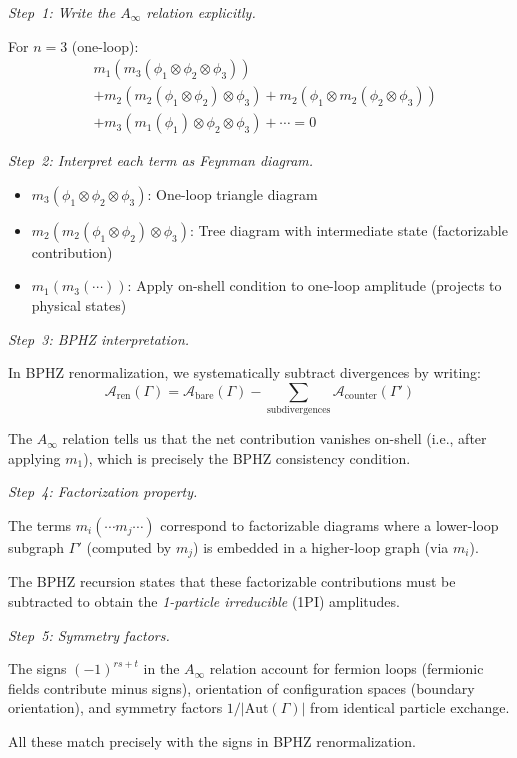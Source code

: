 \begin{evidence}
\emph{Step~1: Write the $A_\infty$ relation explicitly.}

For $n=3$ (one-loop):
\begin{align*}
&m_1(m_3(\phi_1 \otimes \phi_2 \otimes \phi_3)) \\
&+ m_2(m_2(\phi_1 \otimes \phi_2) \otimes \phi_3) + m_2(\phi_1 \otimes m_2(\phi_2 
\otimes \phi_3)) \\
&+ m_3(m_1(\phi_1) \otimes \phi_2 \otimes \phi_3) + \cdots = 0
\end{align*}

\emph{Step~2: Interpret each term as Feynman diagram.}

\begin{itemize}
\item $m_3(\phi_1 \otimes \phi_2 \otimes \phi_3)$: One-loop triangle diagram

\item $m_2(m_2(\phi_1 \otimes \phi_2) \otimes \phi_3)$: Tree diagram with 
intermediate state (factorizable contribution)

\item $m_1(m_3(\cdots))$: Apply on-shell condition to one-loop amplitude 
(projects to physical states)
\end{itemize}

\emph{Step~3: BPHZ interpretation.}

In BPHZ renormalization, we systematically subtract divergences by writing:
\[\mathcal{A}_{\text{ren}}(\Gamma) = \mathcal{A}_{\text{bare}}(\Gamma) - 
\sum_{\text{subdivergences}} \mathcal{A}_{\text{counter}}(\Gamma')\]

The $A_\infty$ relation tells us that the net contribution vanishes on-shell (i.e., 
after applying $m_1$), which is precisely the BPHZ consistency condition.

\emph{Step~4: Factorization property.}

The terms $m_i(\cdots m_j \cdots)$ correspond to factorizable diagrams where a 
lower-loop subgraph $\Gamma'$ (computed by $m_j$) is embedded in a higher-loop 
graph (via $m_i$).

The BPHZ recursion states that these factorizable contributions must be subtracted 
to obtain the \emph{1-particle irreducible} (1PI) amplitudes.

\emph{Step~5: Symmetry factors.}

The signs $(-1)^{rs+t}$ in the $A_\infty$ relation account for fermion loops (fermionic fields contribute minus signs), orientation of configuration spaces (boundary orientation), and symmetry factors $1/|\text{Aut}(\Gamma)|$ from identical particle exchange.

All these match precisely with the signs in BPHZ renormalization.
\end{evidence}

